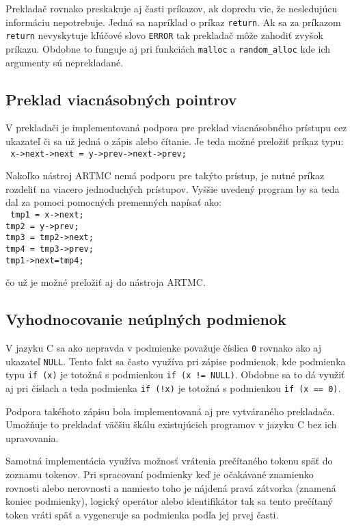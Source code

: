 Prekladač rovnako preskakuje aj časti príkazov, ak dopredu vie, že nesledujúcu informáciu nepotrebuje. Jedná sa napríklad o príkaz \texttt{return}. Ak sa za príkazom \texttt{return} nevyskytuje kľúčové slovo \texttt{ERROR} tak prekladač môže zahodiť zvyšok príkazu. Obdobne to funguje aj pri funkciách \texttt{malloc} a \texttt{random\_alloc} kde ich argumenty sú neprekladané.

\subsection{Preklad viacnásobných pointrov}
V prekladači je implementovaná podpora pre preklad viacnásobného prístupu cez ukazateľ či sa už jedná o zápis alebo čítanie. Je teda možné preložiť príkaz typu:\\

\noindent
\texttt{
x->next->next = y->prev->next->prev;\\
}

Nakoľko nástroj ARTMC nemá podporu pre takýto prístup, je nutné príkaz rozdeliť na viacero jednoduchých prístupov. Vyššie uvedený program by sa teda dal za pomoci pomocných premenných napísať ako:\\

\noindent
\texttt{
tmp1 = x->next;\\
tmp2 = y->prev;\\
tmp3 = tmp2->next;\\
tmp4 = tmp3->prev;\\
tmp1->next=tmp4;\\
}

čo už je možné preložiť aj do nástroja ARTMC.

\subsection{Vyhodnocovanie neúplných podmienok}
V jazyku C sa ako nepravda v podmienke považuje číslica \texttt{0} rovnako ako aj ukazateľ \texttt{NULL}. Tento fakt sa často využíva pri zápise podmienok, kde podmienka typu \texttt{if (x)} je totožná s podmienkou \texttt{if (x != NULL)}. Obdobne sa to dá využiť aj pri číslach a teda podmienka \texttt{if (!x)} je totožná s podmienkou \texttt{if (x == 0)}.

Podpora takéhoto zápisu bola implementovaná aj pre vytváraného prekladača. Umožňuje to prekladať väčšiu škálu existujúcich programov v jazyku C bez ich upravovania.

Samotná implementácia využíva možnosť vrátenia prečítaného tokenu späť do zoznamu tokenov. Pri spracovaní podmienky keď je očakávané znamienko rovnosti alebo nerovnosti a namiesto toho je nájdená pravá zátvorka (znamená koniec podmienky), logický operátor alebo identifikátor tak sa tento prečítaný token vráti späť a vygeneruje sa podmienka podľa jej prvej časti.


